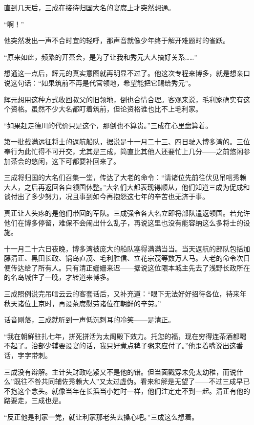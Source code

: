 \documentclass[
]{article}
\begin{document}
直到几天后，三成在接待归国大名的宴席上才突然想通。

``啊！''

他突然发出一声不合时宜的轻呼，那声音就像少年终于解开难题时的雀跃。

``原来如此，频繁的开茶会，是为了让我和秀元大人搞好关系\ldots\ldots{}''

想通这一点后，辉元的真实意图就再明显不过了。他这次专程来博多，就是想亲口说这句话：``如果筑前不再是代官领地，希望能把它赐给秀元''。

辉元想用这种方式收回叔父的旧领地，倒也合情合理。客观来说，毛利家确实有这个资格。虽然不少大名都盯着筑前，但论资格谁也比不上毛利家。

``如果赶走德川的代价只是这个，那倒也不算贵。''三成在心里盘算着。

第一批载满远征将士的返航船队，据说是十一月二十三、四日驶入博多湾的。三位奉行为此忙得不可开交，尤其是三成，简直比其他人还要忙上几分------之前悠闲参加茶会的悠闲，这下可都要补回来了。

三成将归国的大名们召集一堂，传达了大老的命令：``请诸位先前往伏见吊唁秀赖大人，之后再返回各自领国休整。''大名们大都表现得顺从，他们知道三成为促成和谈付出了多少努力，况且事到如今再抱怨这七年的辛苦也无济于事。

真正让人头疼的是他们带回的军队。三成强令各大名立即将部队遣返领国。若允许他们在博多停留，难保不会闹出什么乱子，再说这里也没有能容纳这么多将士的设施。

十一月二十六日夜晚，博多湾被庞大的船队塞得满满当当。当天返航的部队包括加藤清正、黑田长政、锅岛直茂、毛利胜信、立花宗茂等数万人马。大老的命令次日便传达给了所有人。只有清正姗姗来迟------据说这位隈本城主先去了浅野长政所在的名岛城住了一晚，才转道来博多。

三成照例说完吊唁云云的客套话后，又补充道：``眼下无法好好招待各位，待来年秋天诸位上京时，再设茶席慰劳诸位在朝鲜的辛劳。''

话音刚落，三成就听到一声低沉刺耳的冷笑------是清正。

``我在朝鲜驻扎七年，拼死拼活为太阁殿下效力。托您的福，现在穷得连茶酒都喝不起了。治部少辅要设宴的话，我只好煮点稗子粥来应付了。''他歪着嘴说出这番话，字字带刺。

三成没有辩解。主计头财政吃紧又不是他的错。但当面戳穿未免太幼稚，而说什么''既往不咎共同辅佐秀赖大人''又太过虚伪。看来和解是无望了------不过三成早已不抱这个念头。就像当年在长浜当小姓时一样，他们注定走不到一起。清正有他的路要走，三成也是。

``反正他是利家一党，就让利家那老头去操心吧。''三成这么想着。
\end{document}
